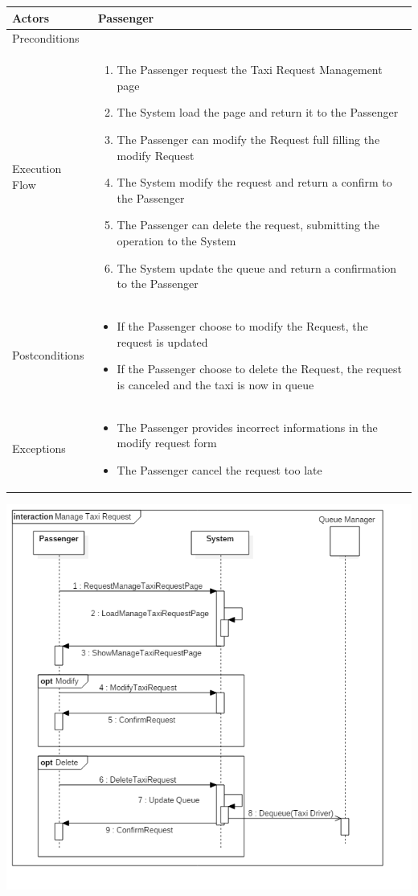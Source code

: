 \documentclass[english]{article}
\begin{document}
\begin{tabular}{lp{8cm}}
\hline
Actors & Passenger \\
\hline
Preconditions &  \\
\hline
Execution Flow &  
		\begin{enumerate}
			\item The Passenger request the Taxi Request Management page
			\item The System load the page and return it to the Passenger
			\item The Passenger can modify the Request full filling the modify Request
			\item The System modify the request and return a confirm to the Passenger
			\item The Passenger can delete the request, submitting the operation to the System
			\item The System update the queue and return a confirmation to the Passenger
		\end{enumerate} 
	\\ 
\hline
Postconditions & 
	\begin{itemize}
		\item If the Passenger choose to modify the Request, the request is updated 
		\item If the Passenger choose to delete the Request, the request is canceled and the taxi is now in queue
	\end{itemize} \\
\hline
Exceptions & 
	\begin{itemize} 
		\item The Passenger provides incorrect informations in the modify request form
		\item The Passenger cancel the request too late
	\end{itemize}
\end{tabular}

\includegraphics[width=\textwidth]{ManageTaxiRequest}
\end{document}
